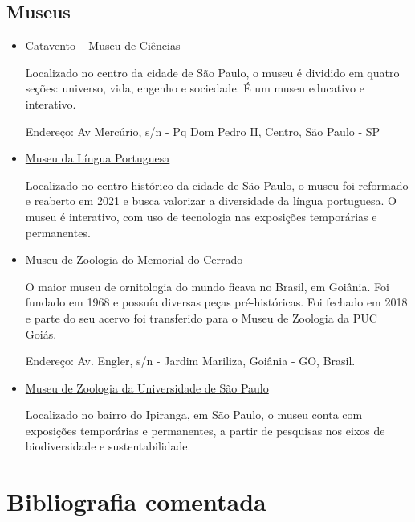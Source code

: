 \documentclass[11pt]{extarticle}
\begin{document}
\subsection{Museus}

\begin{itemize}

\item \href{https://museucatavento.org.br/}{Catavento – Museu de Ciências}

Localizado no centro da cidade de São Paulo, o museu é dividido em quatro seções: universo, vida, engenho e sociedade. É um museu educativo e interativo.

Endereço: Av Mercúrio, s/n - Pq Dom Pedro II, Centro, São Paulo - SP

\item \href{https://www.museudalinguaportuguesa.org.br/}{Museu da Língua Portuguesa}

Localizado no centro histórico da cidade de São Paulo, o museu foi reformado e reaberto em 2021 e busca valorizar a diversidade da língua portuguesa. O museu é interativo, com uso de tecnologia nas exposições temporárias e permanentes.

\item Museu de Zoologia do Memorial do Cerrado

O maior museu de ornitologia do mundo ficava no Brasil, em Goiânia. Foi fundado em 1968 e possuía diversas peças pré-históricas. Foi fechado em 2018 e parte do seu acervo foi transferido para o Museu de Zoologia da PUC Goiás.

Endereço: Av. Engler, s/n - Jardim Mariliza, Goiânia - GO, Brasil.

\item \href{https://mz.usp.br/}{Museu de Zoologia da Universidade de São Paulo}

Localizado no bairro do Ipiranga, em São Paulo, o museu conta com exposições temporárias e permanentes, a partir de pesquisas nos eixos de biodiversidade e sustentabilidade.

\end{itemize}

\section{Bibliografia comentada}
\end{document}
